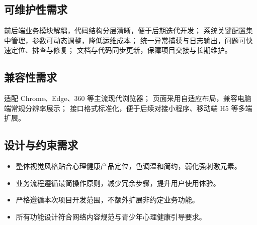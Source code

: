 \subsection{可维护性需求}
前后端业务模块解耦，代码结构分层清晰，便于后期迭代开发；
系统关键配置集中管理，参数可动态调整，降低运维成本；
统一异常捕获与日志输出，问题可快速定位、排查与修复；
文档与代码同步更新，保障项目交接与长期维护。

\subsection{兼容性需求}
适配 Chrome、Edge、360 等主流现代浏览器；
页面采用自适应布局，兼容电脑端常规分辨率展示；
接口格式标准化，便于后续对接小程序、移动端 H5 等多端扩展。

\subsection{设计与约束需求}
\begin{itemize}
    \item 整体视觉风格贴合心理健康产品定位，色调温和简约，弱化强刺激元素。
    \item 业务流程遵循最简操作原则，减少冗余步骤，提升用户使用体验。
    \item 严格遵循本次项目开发范围，不额外扩展非约定业务功能。
    \item 所有功能设计符合网络内容规范与青少年心理健康引导要求。
\end{itemize}
